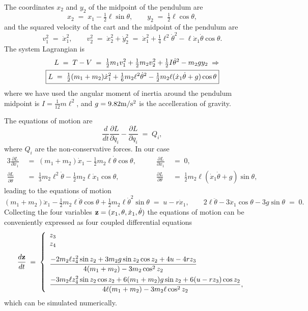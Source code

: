 \documentclass{article}
\newcommand{\bfz}{{\bf z}}
\begin{document}
The coordinates $x_2$ and $y_2$ of the midpoint of the pendulum are
\[
x_2\;=\;x_1-\tfrac{1}{2}\ell\sin\theta,\qquad
y_2\;=\;\tfrac{1}{2}\ell\cos\theta,
\]
and the squared velocity of the cart and the midpoint of the pendulum are
\[
v_1^2\;=\;\dot x_1^2,\qquad v_2^2\;=\;\dot x_2^2+\dot y_2^2\;=\;
\dot x_1^2+\tfrac{1}{4}\ell^2\dot\theta^2-\ell\dot x_1\dot\theta\cos\theta.
\]
The system Lagrangian is
\[
\begin{split}
L\;=\;T-V\;=\;
\tfrac{1}{2}m_1v_1^2+\tfrac{1}{2}m_2v_2^2+\tfrac{1}{2}I\dot\theta^2-m_2gy_2
\;\Rightarrow\\
\protect\boxed{L\;=\;\tfrac{1}{2}(m_1+m_2)\dot
x_1^2+\tfrac{1}{6}m_2\ell^2\dot\theta^2-\tfrac{1}{2}m_2\ell(\dot
x_1\dot\theta+g)\cos\theta}
\end{split}
\]
where we have used the angular moment of inertia around the pendulum
midpoint is $I=\tfrac{1}{12}m\ell^2$, and $g=9.82 {\rm m/s^2}$ is the
accelleration of gravity.

The equations of motion are
\[
\frac{d}{dt}\frac{\partial L}{\partial\dot q_i}-\frac{\partial
  L}{\partial q_i}\;=\;Q_i,
\]
where $Q_i$ are the non-conservative forces. In our case
\begin{alignat}{3}
\frac{\partial L}{\partial\dot x_1}\;&=
\;(m_1+m_2)\dot x_1-\tfrac{1}{2}m_2\ell\dot\theta\cos\theta,&\qquad
\frac{\partial L}{\partial x_1}\;&=\;0,\\
\frac{\partial L}{\partial\dot\theta}\;&=\;\tfrac{1}{3}m_2\ell^2\dot\theta
-\tfrac{1}{2}m_2\ell\dot x_1\cos\theta,&\qquad
\frac{\partial L}{\partial\theta}\;&=\;\tfrac{1}{2}m_2\ell(\dot
x_1\dot\theta+g)\sin\theta,
\end{alignat}
leading to the equations of motion
\[
\boxed{
(m_1+m_2)\ddot x_1-\tfrac{1}{2}m_2\ell\ddot\theta\cos\theta
+\tfrac{1}2m_2\ell\dot\theta^2\sin\theta\;=\;u-r\dot x_1,\qquad
2\ell\ddot\theta-3\ddot x_1\cos\theta-3g\sin\theta\;=\;0.}
\]
Collecting the four variables $\bfz=(x_1,\theta,\dot x_1, \dot\theta)$
the equations of motion can be conveniently expressed as four coupled
differential equations
\[
\frac{d\bfz}{dt}\;=\;\left\{\begin{array}{l}z_3\\ z_4\\[1em]
\displaystyle \frac{-2m_2\ell z_4^2\sin z_2+3m_2g\sin z_2\cos z_2+4u-4rz_3}
{4(m_1+m_2)-3m_2\cos^2 z_2}\\[1em] \displaystyle
\frac{-3m_2\ell z_4^2\sin z_2\cos z_2+6(m_1+m_2)g\sin z_2+6(u-rz_3)\cos z_2}
{4\ell(m_1+m_2)-3m_2\ell\cos^2 z_2}, \end{array}\right.
\]
which can be simulated numerically.
\end{document}
